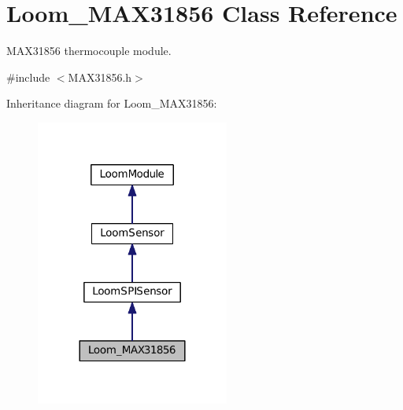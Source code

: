 \hypertarget{class_loom___m_a_x31856}{}\section{Loom\+\_\+\+M\+A\+X31856 Class Reference}
\label{class_loom___m_a_x31856}


M\+A\+X31856 thermocouple module.  




{\ttfamily \#include $<$M\+A\+X31856.\+h$>$}



Inheritance diagram for Loom\+\_\+\+M\+A\+X31856\+:\nopagebreak
\begin{figure}[H]
\begin{center}
\leavevmode
\includegraphics[width=180pt]{class_loom___m_a_x31856__inherit__graph}
\end{center}
\end{figure}
